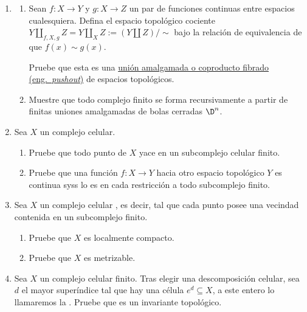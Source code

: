\documentclass[11pt, reqno]{amsart}
\begin{document}
\begin{enumerate}
	\item
		\begin{enumerate}
			\item Sean $f \colon X \to Y$ y $g \colon X \to Z$ un par de funciones continuas entre espacios cualesquiera.
				Defina el espacio topológico cociente $Y \amalg_{f,X,g} Z = Y \amalg_X Z := (Y \amalg Z)/{\sim}$ bajo la
				relación de equivalencia de que $f(x) \sim g(x)$.
				
				Pruebe que esta es una \href{https://ncatlab.org/nlab/show/pushout#definition}{unión amalgamada o coproducto
				fibrado (eng.\ \emph{pushout})} de espacios topológicos.

			\item Muestre que todo complejo finito se forma recursivamente a partir de finitas uniones amalgamadas de bolas cerradas $\D^n$.
		\end{enumerate}

	\item Sea $X$ un complejo celular.
		\begin{enumerate}
			\item Pruebe que todo punto de $X$ yace en un subcomplejo celular finito.

			\item Pruebe que una función $f \colon X \to Y$ hacia otro espacio topológico $Y$ es continua syss lo es en cada
				restricción a todo subcomplejo finito.
		\end{enumerate}

	\item Sea $X$ un complejo celular , es decir, tal que cada punto posee una vecindad contenida en un
		subcomplejo finito.
		\begin{enumerate}
			\item Pruebe que $X$ es localmente compacto.

			\item Pruebe que $X$ es metrizable.
		\end{enumerate}

	\item Sea $X$ un complejo celular finito.
		Tras elegir una descomposición celular, sea $d$ el mayor superíndice tal que hay una célula $e^d \subseteq X$, a este entero
		lo llamaremos la .
		Pruebe que es un invariante topológico.
\end{enumerate}
\end{document}
